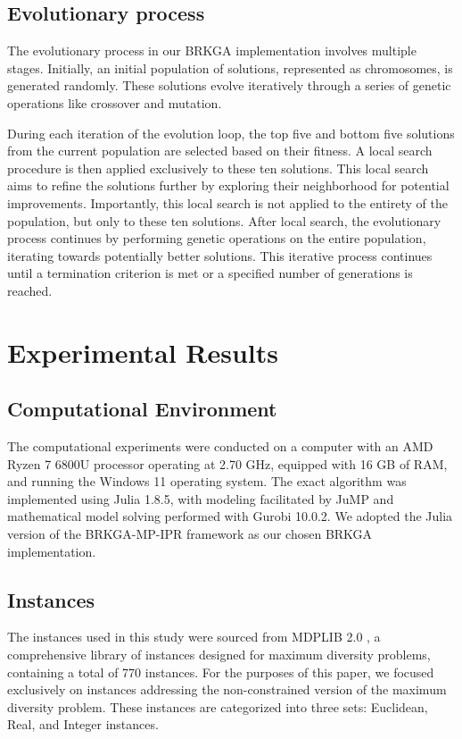 \documentclass[preprint,12pt]{elsarticle}
\begin{document}
\subsection{Evolutionary process}
The evolutionary process in our BRKGA implementation involves multiple stages. Initially, an initial population of solutions, represented as chromosomes, is generated randomly. These solutions evolve iteratively through a series of genetic operations like crossover and mutation.

During each iteration of the evolution loop, the top five and bottom five solutions from the current population are selected based on their fitness. A local search procedure is then applied exclusively to these ten solutions. This local search aims to refine the solutions further by exploring their neighborhood for potential improvements. Importantly, this local search is not applied to the entirety of the population, but only to these ten solutions. After local search, the evolutionary process continues by performing genetic operations on the entire population, iterating towards potentially better solutions. This iterative process continues until a termination criterion is met or a specified number of generations is reached.

\section{Experimental Results}
\subsection{Computational Environment}
The computational experiments were conducted on a computer with an AMD Ryzen 7 6800U processor operating at 2.70 GHz, equipped with 16 GB of RAM, and running the Windows 11 operating system. The exact algorithm was implemented using Julia 1.8.5, with modeling facilitated by JuMP \cite{Lubin2023} and mathematical model solving performed with Gurobi 10.0.2. We adopted the Julia version of the BRKGA-MP-IPR framework \cite{Andrade2021-pe} as our chosen BRKGA implementation.

\subsection{Instances}
The instances used in this study were sourced from MDPLIB 2.0 \cite{marti2021mdplib}, a comprehensive library of instances designed for maximum diversity problems, containing a total of 770 instances. For the purposes of this paper, we focused exclusively on instances addressing the non-constrained version of the maximum diversity problem. These instances are categorized into three sets: Euclidean, Real, and Integer instances.
\end{document}
